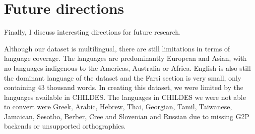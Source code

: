 


\section{Future directions}
\label{sec:17-futurework}

Finally, I discuss interesting directions for future research.

Although our dataset is multilingual, there are still limitations in terms of language coverage. The languages are predominantly European and Asian, with no languages indigenous to the Americas, Australia or Africa. English is also still the dominant language of the dataset and the Farsi section is very small, only containing 43 thousand words. In creating this dataset, we were limited by the languages available in CHILDES. The languages in CHILDES we were not able to convert were Greek, Arabic, Hebrew, Thai, Georgian, Tamil, Taiwanese, Jamaican, Sesotho, Berber, Cree and Slovenian and Russian due to missing G2P backends or unsupported orthographies.

